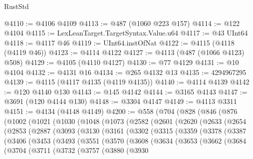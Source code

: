 \begin{lexlean}{RustStd}
\begin{coremodule}
@4110 := @4106 @4109
@4113 := @487 (@1060 @223 @157)
@4114 := @122 @4104
@4115 := LexLeanTarget.TargetSyntax.Value.u64
@4117 := @43 UInt64
@4118 := @4117 @46
@4119 := UInt64.instOfNat
@4122 := @4115 (@4118 (@4119 @46))
@4123 := @4114 @4122
@4127 := @4113 (@487 (@1066 @4123) @508)
@4129 := @4105 (@4110 @4127)
@4130 := @77 @4129
@4131 := @10 @4104
@4132 := @4131 @16
@4134 := @265 @4132 @13
@4135 := 4294967295
@4139 := @4115 (@4117 @4135 (@4119 @4135))
@4140 := @4114 @4139
@4142 := @120 @4140 @130
@4143 := @145 @4142
@4144 := @3165 @4143
@4147 := @3691 (@120 @4144 @130)
@4148 := @3304 @4147
@4149 := @4113 @3311
@4151 := @4134 (@4148 @4149)
@4200 := @558
    (@704
      (@828
        (@846
          (@876
            (@1002
              (@1021
                (@1030
                  (@1048
                    (@1073
                      (@2582
                        (@2601
                          (@2620
                            (@2633
                              (@2654
                                (@2853
                                  (@2887
                                    (@3093
                                      (@3130
                                        (@3161
                                          (@3302
                                            (@3315
                                              (@3359
                                                (@3378
                                                  (@3387
                                                    (@3406
                                                      (@3453
                                                        (@3493
                                                          (@3551
                                                            (@3570
                                                              (@3608
                                                                (@3634
                                                                  (@3653
                                                                    (@3662
                                                                      (@3684
                                                                        (@3704
                                                                          (@3711
                                                                            (@3732
                                                                              (@3757
                                                                                (@3880
                                                                                  (@3930

\end{coremodule}
\end{lexlean}
